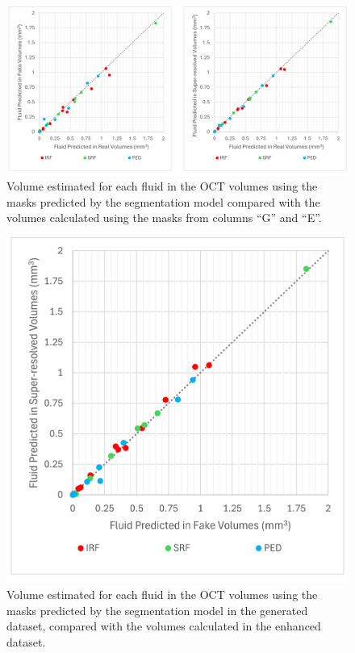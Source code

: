 \begin{figure}[!ht]
	\centering	\includegraphics[width=1.0\linewidth]{figures/Experiment6PredictedVsAll.png}
	\caption{Volume estimated for each fluid in the OCT volumes using the masks predicted by the segmentation model compared with the volumes calculated using the masks from columns ``G'' and ``E''.}
	\label{fig:Experiment6PredictedVsAll}
\end{figure}

\begin{figure}[!ht]
	\centering	\includegraphics[width=0.50\linewidth]{figures/Experiment6GeneratedVsEnhanced.png}
	\caption{Volume estimated for each fluid in the OCT volumes using the masks predicted by the segmentation model in the generated dataset, compared with the volumes calculated in the enhanced dataset.}
	\label{fig:Experiment6GeneratedVsEnhanced}
\end{figure}

